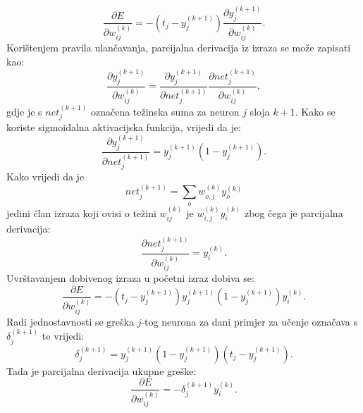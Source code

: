 \documentclass[times, utf8, zavrsni, numeric]{fer}
\begin{document}
\[
    \frac{\partial E}{\partial w_{ij}^{(k)}}
    = -(t_j - y_j^{(k + 1)})\frac{\partial y_j^{(k + 1)}}{\partial w_{ij}^{(k)}}.
\]
Korištenjem pravila ulančavanja, parcijalna derivacija iz izraza se može zapisati kao:
\[
    \frac{\partial y_j^{(k + 1)}}{\partial w_{ij}^{(k)}}
    = \frac{\partial y_j^{(k + 1)}}{\partial net_{j}^{(k+1)}}
    \frac{\partial net_{j}^{(k+1)}}{\partial w_{ij}^{(k)}},
\]
gdje je s $net_{j}^{(k+1)}$ označena težinska suma za neuron $j$ sloja $k+1$. Kako se koriste sigmoidalna aktivacijska funkcija, vrijedi da je:
\[
    \frac{\partial y_j^{(k + 1)}}{\partial net_{j}^{(k+1)}}
    = y_j^{(k + 1)} (1 - y_j^{(k + 1)}).
\]
Kako vrijedi da je
\[
    net_{j}^{(k+1)} = \displaystyle\sum_o w_{o,j}^{(k)}y_o^{(k)}    
\]
jedini član izraza koji ovisi o težini $w_{ij}^{(k)}$ je $w_{i,j}^{(k)}y_i^{(k)}$ zbog čega je parcijalna derivacija:
\[
    \frac{\partial net_{j}^{(k+1)}}{\partial w_{ij}^{(k)}} = y_i^{(k)}.
\]
Uvrštavanjem dobivenog izraza u početni izraz dobiva se:
\[
    \frac{\partial E}{\partial w_{ij}^{(k)}}
    = -(t_j - y_j^{(k + 1)})
    y_j^{(k + 1)} (1 - y_j^{(k + 1)})
    y_i^{(k)}.
\]
Radi jednostavnosti se greška $j$-tog neurona za dani primjer za učenje označava s $\delta_j^{(k+1)}$ te vrijedi:
\[
    \delta_j^{(k+1)} = y_j^{(k + 1)}(1 - y_j^{(k + 1)})(t_j - y_j^{(k + 1)}).
\]
Tada je parcijalna derivacija ukupne greške:
\[
    \frac{\partial E}{\partial w_{ij}^{(k)}} = -\delta_j^{(k+1)}y_i^{(k)}.
\]
\end{document}
